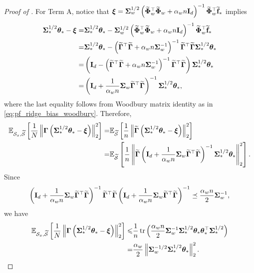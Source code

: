 \begin{proof}[Proof of ]
    For Term A, notice that $\xib = \Sigmab_w^{1/2} \rbr{\wt\Phib_w^\top \wt\Phib_w + \alpha_w n \Ib_d}^{-1} \wt\Phib_w^\top \wt\fb_*$ implies
    \begin{align*}
        \Sigmab_*^{1/2} \thetab_* - \xib 
        = &\Sigmab_*^{1/2} \thetab_* - \Sigmab_w^{1/2} \rbr{\wt\Phib_w^\top \wt\Phib_w + \alpha_w n \Ib_d}^{-1} \wt\Phib_w^\top \wt\fb_* \\
        = &\Sigmab_*^{1/2} \thetab_* - \rbr{\wt\Gammab^\top \wt\Gammab + \alpha_w n \Sigmab_w^{-1}}^{-1} \wt\Gammab^\top \wt\Gammab \Sigmab_*^{1/2} \thetab_* \\
        = &\rbr{\Ib_d - \rbr{\wt\Gammab^\top \wt\Gammab + \alpha_w n \Sigmab_w^{-1}}^{-1} \wt\Gammab^\top \wt\Gammab} \Sigmab_*^{1/2} \thetab_* \\
        = &\rbr{\Ib_d + \frac{1}{\alpha_w n} \Sigmab_w \wt\Gammab^\top \wt\Gammab}^{-1} \Sigmab_*^{1/2} \thetab_*,
    \end{align*}
    where the last equality follows from Woodbury matrix identity as in \eqref{eq:pf_ridge_bias_woodbury}.
    Therefore,
    \begin{align*}
        \E_{\Scal_x, \wt\Scal}\sbr{\frac{1}{N} \nbr{\Gammab \rbr{\Sigmab_*^{1/2} \thetab_* - \xib}}_2^2} 
        = &\E_{\wt\Scal}\sbr{\frac{1}{n} \nbr{\wt\Gammab \rbr{\Sigmab_*^{1/2} \thetab_* - \xib}}_2^2} \\
        = &\E_{\wt\Scal}\sbr{\frac{1}{n} \nbr{\wt\Gammab \rbr{\Ib_d + \frac{1}{\alpha_w n} \Sigmab_w \wt\Gammab^\top \wt\Gammab}^{-1} \Sigmab_*^{1/2} \thetab_*}_2^2}.
    \end{align*}
    Since 
    \begin{align*}
        \rbr{\Ib_d + \frac{1}{\alpha_w n} \Sigmab_w \wt\Gammab^\top \wt\Gammab}^{-1} \wt\Gammab^\top \wt\Gammab \rbr{\Ib_d + \frac{1}{\alpha_w n} \Sigmab_w \wt\Gammab^\top \wt\Gammab}^{-1} \preceq \frac{\alpha_w n}{2} \Sigmab_w^{-1},
    \end{align*}
    we have
    \begin{align}\label{eq:pf_ridge_bias_term1}
    \begin{split}
        \E_{\Scal_x, \wt\Scal}\sbr{\frac{1}{N} \nbr{\Gammab \rbr{\Sigmab_*^{1/2} \thetab_* - \xib}}_2^2} 
        \le &\frac{1}{n} \tr\rbr{\frac{\alpha_w n}{2} \Sigmab_w^{-1} \Sigmab_*^{1/2} \thetab_* \thetab_*^\top \Sigmab_*^{1/2}} \\
        = &\frac{\alpha_w}{2} \nbr{\Sigmab_w^{-1/2} \Sigmab_*^{1/2} \thetab_*}_2^2.
    \end{split}
    \end{align}
    

\end{proof}
